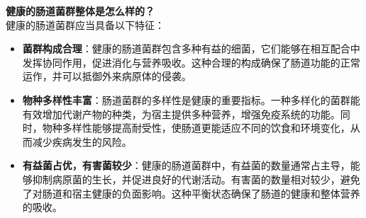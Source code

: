 \documentclass[UTF8]{ctexart}
\begin{document}
\begin{tcolorbox}[
    enhanced,
    colback=lightpurple!10, %
    colframe=white,  %
    arc=3mm,
    boxrule=0.5pt,
    width=\textwidth,
    top=8pt,
    bottom=8pt
]
{\small{\color{lightpurple}\faQuestionCircle}\quad \textbf{健康的肠道菌群整体是怎么样的？}\\
{\color{orange!50}\faComments}\quad 健康的肠道菌群应当具备以下特征：
\begin{itemize}
    \item \textbf{菌群构成合理}：健康的肠道菌群包含多种有益的细菌，它们能够在相互配合中发挥协同作用，促进消化与营养吸收。这种合理的构成确保了肠道功能的正常运作，并可以抵御外来病原体的侵袭。
    \item \textbf{物种多样性丰富}：肠道菌群的多样性是健康的重要指标。一种多样化的菌群能有效增加代谢产物的种类，为宿主提供多种营养，增强免疫系统的功能。同时，物种多样性能够提高耐受性，使肠道更能适应不同的饮食和环境变化，从而减少疾病发生的风险。
    \item \textbf{有益菌占优，有害菌较少}：健康的肠道菌群中，有益菌的数量通常占主导，能够抑制病原菌的生长，并促进良好的代谢活动。有害菌的数量相对较少，避免了对肠道和宿主健康的负面影响。这种平衡状态确保了肠道的健康和整体营养的吸收。
\end{itemize}
}
\end{tcolorbox}

\end{document}
